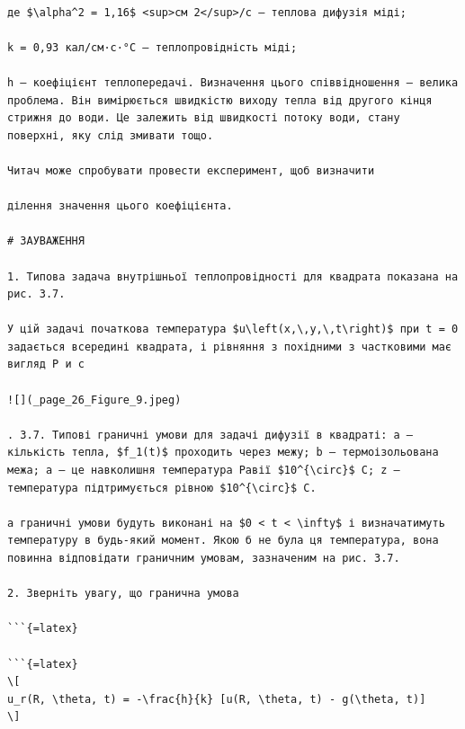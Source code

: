 \documentclass[
  ukrainian,
]{article}
\begin{document}
\begin{verbatim}

де $\alpha^2 = 1,16$ <sup>см 2</sup>/с — теплова дифузія міді;

k = 0,93 кал/см·с·°C — теплопровідність міді;

h — коефіцієнт теплопередачі. Визначення цього співвідношення — велика проблема. Він вимірюється швидкістю виходу тепла від другого кінця стрижня до води. Це залежить від швидкості потоку води, стану поверхні, яку слід змивати тощо.

Читач може спробувати провести експеримент, щоб визначити

ділення значення цього коефіцієнта.

# ЗАУВАЖЕННЯ

1. Типова задача внутрішньої теплопровідності для квадрата показана на рис. 3.7.

У цій задачі початкова температура $u\left(x,\,y,\,t\right)$ при t = 0 задається всередині квадрата, і рівняння з похідними з частковими має вигляд Р и с

![](_page_26_Figure_9.jpeg)

. 3.7. Типові граничні умови для задачі дифузії в квадраті: a — кількість тепла, $f_1(t)$ проходить через межу; b — термоізольована межа; a — це навколишня температура Равії $10^{\circ}$ C; z — температура підтримується рівною $10^{\circ}$ C.

а граничні умови будуть виконані на $0 < t < \infty$ і визначатимуть температуру в будь-який момент. Якою б не була ця температура, вона повинна відповідати граничним умовам, зазначеним на рис. 3.7.

2. Зверніть увагу, що гранична умова

```{=latex}

```{=latex}
\[
u_r(R, \theta, t) = -\frac{h}{k} [u(R, \theta, t) - g(\theta, t)]
\]
\end{verbatim}
\end{document}
